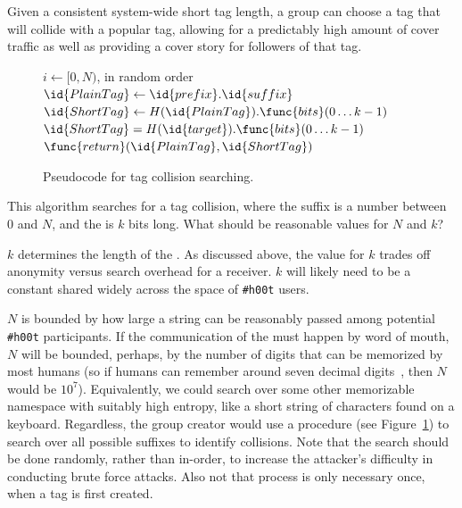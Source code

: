 \documentclass{sig-alternate-arxiv}
\newcommand{\hoot}{{\tt \#h00t}\xspace}
\begin{document}
Given a consistent system-wide short tag length, a group can choose a
tag that will collide with a popular tag, allowing for a predictably
high amount of cover traffic as well as providing a cover story for
followers of that tag.
%
\begin{figure}
\begin{codebox}
\zi \For $i \gets [0,N)$, in random order
\zi \Do
\zi $\id{PlainTag} \gets  \id{prefix}.\id{suffix}$
\zi $\id{ShortTag} \gets H(\id{PlainTag}).\func{bits}(0 \ldots k-1)$
\zi \If $\id{ShortTag} = H(\id{target}).\func{bits}(0 \ldots k-1)$
\zi \Then $\func{return} (\id{PlainTag} , \id{ShortTag})$
\zi \End
\End
\end{codebox}
\caption{Pseudocode for tag collision searching.\label{fig:find-tag}}
\end{figure}

%
This algorithm searches for a tag collision, where the 
suffix is a number between 0 and $N$, and the  is $k$ bits
long.  What should be reasonable values for $N$ and $k$?

$k$ determines the length of the . As discussed above, the
value for $k$ trades off anonymity versus search overhead for a
receiver. $k$ will likely need to be a constant shared widely across the
space of \hoot users.

$N$ is bounded by how large a  string can be reasonably
passed among potential \hoot participants. If the communication of the
 must happen by word of mouth, $N$ will be bounded,
perhaps, by the number of digits that can be memorized by most humans
(so if humans can remember around seven decimal digits~\cite{miller56},
then $N$ would be $10^7$). Equivalently, we could search over some other
memorizable namespace with suitably high entropy, like a short string of
characters found on a keyboard.  Regardless, the group creator would use
a  procedure (see Figure~\ref{fig:find-tag}) to search
over all possible suffixes to identify collisions. Note that the search
should be done randomly, rather than in-order, to increase the
attacker's difficulty in conducting brute force attacks. Also not that
process is only necessary once, when a tag is first created.
\end{document}
